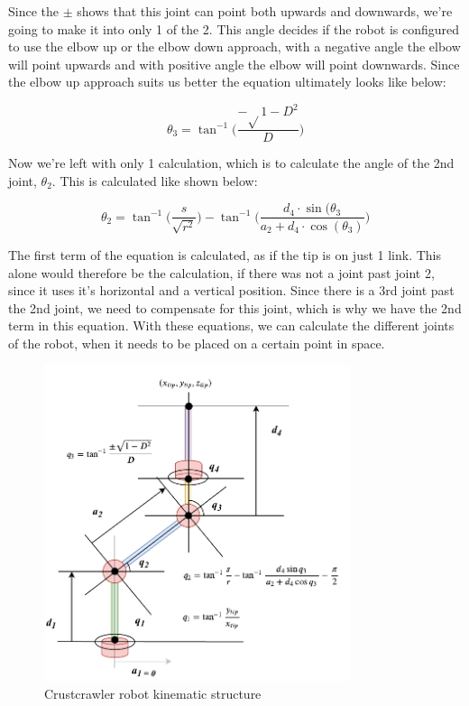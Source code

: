 Since the $\pm$ shows that this joint can point both upwards and downwards, we're going to make it into only 1 of the 2. This angle decides if the robot is configured to use the elbow up or the elbow down approach, with a negative angle the elbow will point upwards and with positive angle the elbow will point downwards. Since the elbow up approach suits us better the equation ultimately looks like below:

\begin{equation*}
    \theta_3 = \tan^{-1}\Bigg(\frac{-\sqrt{}1-D^2}{D}\Bigg)
\end{equation*}

Now we're left with only 1 calculation, which is to calculate the angle of the 2nd joint, $\theta_2$. This is calculated like shown below:

\begin{equation*}
    \theta_2 = \tan^{-1}\Big(\frac{s}{\sqrt{r^2}}\Big) - \tan^{-1}\bigg(\frac{d_4 \cdot \sin(\theta_3}{a_2 + d_4 \cdot \cos(\theta_3)}\bigg)
\end{equation*}

The first term of the equation is calculated, as if the tip is on just 1 link. This alone would therefore be the calculation, if there was not a joint past joint 2, since it uses it's horizontal and a vertical position. Since there is a 3rd joint past the 2nd joint, we need to compensate for this joint, which is why we have the 2nd term in this equation.\newline
With these equations, we can calculate the different joints of the robot, when it needs to be placed on a certain point in space.

\begin{figure}[h!]
    \centering
    \includegraphics[width=0.8\textwidth]{figures/rob1_inv_kin.pdf}
    \caption{Crustcrawler robot kinematic structure}
    \label{fig:my_label}
\end{figure}

